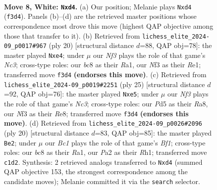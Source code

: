 \documentclass[11pt]{article}
\begin{document}
\begin{figure}[p]\centering
\begin{subfigure}{0.46\textwidth}\centering
\resizebox{\linewidth}{!}{%
\newchessgame
\chessboard[
  setfen={rnbq1rk1/pp3ppp/4pn2/3P4/1b1p4/2NBPN2/PP3PPP/R1BQK2R w KQ - 0 8},
  showmover=false,
  pgfstyle=straightmove, color=movearrow, markmove={f3-d4}
]}
\caption{}
\end{subfigure}\hfill
\begin{subfigure}{0.46\textwidth}\centering
\resizebox{\linewidth}{!}{%
\newchessgame
\chessboard[
  setfen={rnb2rk1/1p2ppbp/5np1/p1q5/4p3/P1NB1N2/1PP2PPP/R1BQR1K1 w - - 0 11},
  showmover=false,
  pgfstyle=straightmove, color=movearrow, markmove={c3-e4}
]}
\caption{}
\end{subfigure}
\\[4pt]
\begin{subfigure}{0.46\textwidth}\centering
\resizebox{\linewidth}{!}{%
\newchessgame
\chessboard[
  setfen={r1bqr1k1/1pp2pp1/p1nb1n1p/4P3/2B5/P1N1PN1P/1PQB1PP1/R4RK1 b - - 0 13},
  showmover=false,
  pgfstyle=straightmove, color=movearrow, markmove={c6-e5}
]}
\caption{}
\end{subfigure}\hfill
\begin{subfigure}{0.46\textwidth}\centering
\resizebox{\linewidth}{!}{%
\newchessgame
\chessboard[
  setfen={r2qnrk1/pp3pbp/2np2p1/4P3/2P2Pb1/2N1BN2/PP4PP/R2QKB1R w KQ - 0 11},
  showmover=false,
  pgfstyle=straightmove, color=movearrow, markmove={f1-e2}
]}
\caption{}
\end{subfigure}
\caption{\textbf{Move 8, White: \texttt{Nxd4}.} (a) Our position; Melanie plays \texttt{Nxd4} (\texttt{f3d4}). Panels (b)--(d) are the retrieved master positions whose correspondence most drove this move (highest QAP objective among those that transfer to it). (b) Retrieved from \texttt{lichess\_elite\_2024-09\_p0017\#967} (ply 20) [structural distance $d$=88, QAP obj=78]: the master played \texttt{Nxe4}; under $\mu$ our \emph{Nf3} plays the role of that game's \emph{Nc3}; cross-type roles: our \emph{b}c8 as their \emph{R}a1, our \emph{N}f3 as their \emph{R}e1; transferred move \texttt{f3d4} \textbf{(endorses this move)}. (c) Retrieved from \texttt{lichess\_elite\_2024-09\_p0019\#2251} (ply 25) [structural distance $d$=92, QAP obj=76]: the master played \texttt{Nxe5}; under $\mu$ our \emph{Nf3} plays the role of that game's \emph{Nc3}; cross-type roles: our \emph{P}d5 as their \emph{R}a8, our \emph{N}f3 as their \emph{R}e8; transferred move \texttt{f3d4} \textbf{(endorses this move)}. (d) Retrieved from \texttt{lichess\_elite\_2024-09\_p0026\#2096} (ply 20) [structural distance $d$=83, QAP obj=85]: the master played \texttt{Be2}; under $\mu$ our \emph{Bc1} plays the role of that game's \emph{Bf1}; cross-type roles: our \emph{b}c8 as their \emph{R}a1, our \emph{P}a2 as their \emph{R}h1; transferred move \texttt{c1d2}. Synthesis: 2 retrieved analogs transferred to \texttt{Nxd4} (summed QAP objective 153, the strongest correspondence among the candidate moves); Melanie committed it via the \texttt{search} selector.}
\label{fig:thought-m14}
\end{figure}
\end{document}
